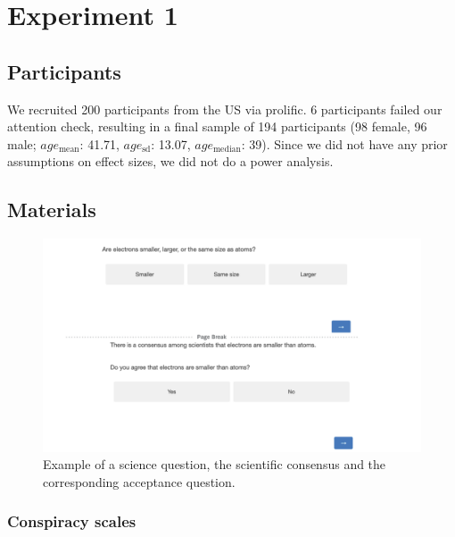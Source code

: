\documentclass[
  doc,floatsintext]{apa6}
\begin{document}
\clearpage

\section{Experiment 1}\label{exp1}

\subsection{Participants}\label{participants-1}

We recruited 200 participants from the US via prolific. 6 participants failed our attention check, resulting in a final sample of 194 participants (98 female, 96 male; \(age_\text{mean}\): 41.71, \(age_\text{sd}\): 13.07, \(age_\text{median}\): 39). Since we did not have any prior assumptions on effect sizes, we did not do a power analysis.

\subsection{Materials}\label{materials-2}

\FloatBarrier



\begin{figure}

\includegraphics[width=1\linewidth]{./figures/study1_question_example} \hfill{}

\caption{Example of a science question, the scientific consensus and the corresponding acceptance question.}\label{fig:stimulus-example}
\end{figure}

\subsubsection{Conspiracy scales}\label{conspiracy-scales}
\end{document}
